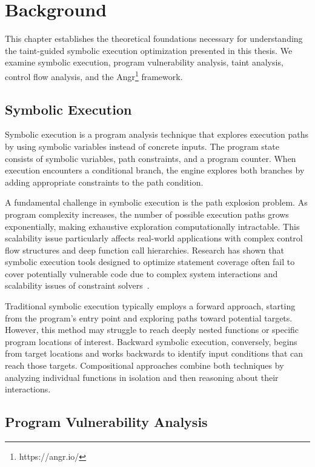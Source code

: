 \chapter{Background}
\label{ch:background}

This chapter establishes the theoretical foundations necessary for understanding the taint-guided symbolic execution optimization presented in this thesis. We examine symbolic execution, program vulnerability analysis, taint analysis, control flow analysis, and the Angr\footnote{https://angr.io/} framework.

\section{Symbolic Execution}

Symbolic execution is a program analysis technique that explores execution paths by using symbolic variables instead of concrete inputs. The program state consists of symbolic variables, path constraints, and a program counter. When execution encounters a conditional branch, the engine explores both branches by adding appropriate constraints to the path condition.

A fundamental challenge in symbolic execution is the path explosion problem. As program complexity increases, the number of possible execution paths grows exponentially, making exhaustive exploration computationally intractable. This scalability issue particularly affects real-world applications with complex control flow structures and deep function call hierarchies. Research has shown that symbolic execution tools designed to optimize statement coverage often fail to cover potentially vulnerable code due to complex system interactions and scalability issues of constraint solvers~\cite{schwartz_all_2010}.

Traditional symbolic execution typically employs a forward approach, starting from the program's entry point and exploring paths toward potential targets. However, this method may struggle to reach deeply nested functions or specific program locations of interest. Backward symbolic execution, conversely, begins from target locations and works backwards to identify input conditions that can reach those targets. Compositional approaches combine both techniques by analyzing individual functions in isolation and then reasoning about their interactions.

\section{Program Vulnerability Analysis}

